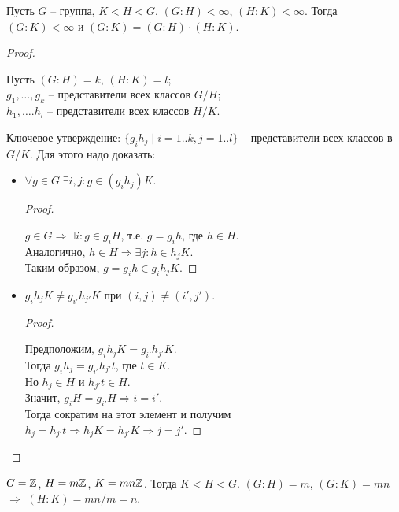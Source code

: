 \begin{theorem-non}
    Пусть $G$ -- группа, $K < H < G$, $(G : H) < \infty$,
    $(H : K) < \infty$. Тогда $(G : K) < \infty$ и
    $(G : K) = (G : H) \cdot (H : K)$.
\end{theorem-non}
\begin{proof} $ $

    Пусть $(G : H) = k$, $(H : K) = l$; \\
    $g_1, \dots, g_k$ -- представители всех классов $G/H$; \\
    $h_1, \dots. h_l$ -- представители всех классов $H/K$.

    Ключевое утверждение: $\{ g_i h_j \mid i = 1..k, j = 1..l \}$
    -- представители всех классов в $G/K$. Для этого надо
    доказать:
    \begin{itemize}
        \item $\forall g \in G \; \exists i, j : g \in (g_i h_j) K$.
        \begin{proof} $ $

            $g \in G \Rightarrow \exists i : g \in g_i H$,
            т.е. $g = g_i h$, где $h \in H$. \\
            Аналогично, $h \in H \Rightarrow \exists j : h \in h_j K$.\\
            Таким образом, $g = g_i h \in g_i h_j K$.
        \end{proof}
        \item $g_i h_j K \neq g_{i'} h_{j'} K$ при 
        $(i, j) \neq (i', j')$.
        \begin{proof} $ $

            Предположим, $g_i h_j K = g_{i'} h_{j'} K$. \\
            Тогда $g_i h_j = g_{i'} h_{j'} t$, где $t \in K$. \\
            Но $h_j \in H$ и $h_{j'} t \in H$. \\ 
            Значит, $g_i H = g_{i'} H \Rightarrow i = i'$. \\
            Тогда сократим
            на этот элемент и получим \\ $h_j = h_{j'} t
            \Rightarrow h_j K = h_{j'} K \Rightarrow j = j'$.
        \end{proof}
    \end{itemize}
\end{proof}

\begin{example}
    $G = \mathbb{Z}$, $H = m\mathbb{Z}$, $K = mn\mathbb{Z}$. Тогда $K < H < G$.
    $(G : H) = m$, $(G : K) = mn$ $\Rightarrow$ $(H : K) = mn/m = n$.
\end{example}

